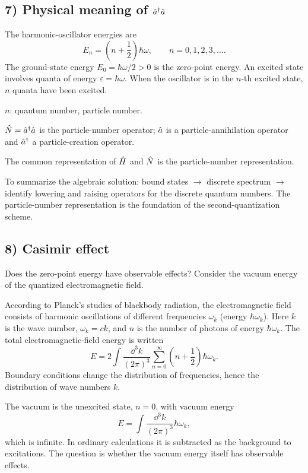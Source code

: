 \subsection*{7) Physical meaning of $\hat{a}^{\dagger}\hat{a}$}
The harmonic-oscillator energies are
\begin{equation}
E_n=\left(n+\frac12\right)\hbar\omega,\qquad n=0,1,2,3,\ldots.
\end{equation}
The ground-state energy $E_0=\hbar\omega/2>0$ is the zero-point energy. An excited state involves quanta of energy $\varepsilon=\hbar\omega$. When the oscillator is in the $n$-th excited state, $n$ quanta have been excited.

$n$: quantum number, particle number.

$\hat{N}=\hat{a}^{\dagger}\hat{a}$ is the particle-number operator; $\hat{a}$ is a particle-annihilation operator and $\hat{a}^{\dagger}$ a particle-creation operator.

The common representation of $\hat{H}$ and $\hat{N}$ is the particle-number representation.

To summarize the algebraic solution: bound states $\to$ discrete spectrum $\to$ identify lowering and raising operators for the discrete quantum numbers. The particle-number representation is the foundation of the second-quantization scheme.

\subsection*{8) Casimir effect}
Does the zero-point energy have observable effects? Consider the vacuum energy of the quantized electromagnetic field.

According to Planck's studies of blackbody radiation, the electromagnetic field consists of harmonic oscillations of different frequencies $\omega_k$ (energy $\hbar\omega_k$). Here $k$ is the wave number, $\omega_k=ck$, and $n$ is the number of photons of energy $\hbar\omega_k$. The total electromagnetic-field energy is written
\begin{equation}
E=2\int\frac{\dd^3k}{(2\pi)^3}\sum_{n=0}^{\infty}
\left(n+\frac12\right)\hbar\omega_k.
\end{equation}
Boundary conditions change the distribution of frequencies, hence the distribution of wave numbers $k$.

The vacuum is the unexcited state, $n=0$, with vacuum energy
\begin{equation}
E=\int\frac{\dd^3k}{(2\pi)^3}\hbar\omega_k,
\end{equation}
which is infinite. In ordinary calculations it is subtracted as the background to excitations. The question is whether the vacuum energy itself has observable effects.

